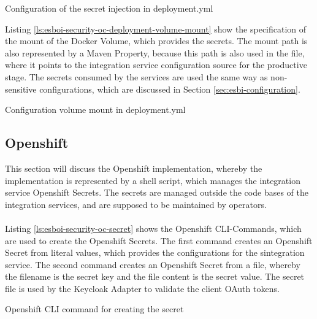 \begin{listing}[h]
	\caption{Configuration of the secret injection in deployment.yml}
	\label{ls:esboi-security-oc-deployment-volume-secret}
\end{listing}

Listing \vref{ls:esboi-security-oc-deployment-volume-mount} show the specification of the mount of the Docker Volume, which provides the secrets. The mount path is also represented by a Maven Property, because this path is also used in the  file, where it points to the integration service configuration source for the productive stage. The secrets consumed by the services are used the same way as non-sensitive configurations, which are discussed in Section \vref{sec:esbi-configuration}.

\begin{listing}[h]
	\caption{Configuration volume mount in deployment.yml}
	\label{ls:esboi-security-oc-deployment-volume-mount}
\end{listing}

\subsection{Openshift}
\label{sec:esbi-security-openshift}
This section will discuss the Openshift implementation, whereby the implementation is represented by a shell script, which manages the integration service Openshift Secrets. The secrets are managed outside the code bases of the integration services, and are supposed to be maintained by operators.
\\ \\
Listing \vref{ls:esboi-security-oc-secret} shows the Openshift CLI-Commands, which are used to create the Openshift Secrets. The first command creates an Openshift Secret from literal values, which provides the configurations for the sintegration service. The second command creates an Openshift Secret from a file, whereby the filename is the secret key and the file content is the secret value. The secret file is used by the Keycloak Adapter to validate the client OAuth tokens. 
\newpage 

\begin{listing}[h]
	\caption{Openshift CLI command for creating the secret}
	\label{ls:esboi-security-oc-secret}
\end{listing}

